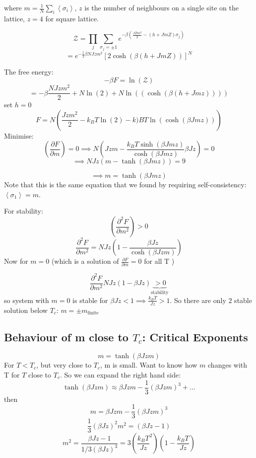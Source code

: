 \documentclass[11pt]{book}
\theoremstyle{definition}
\begin{document}
where $ m = \frac{1}{N}\sum_i \left \langle \sigma_i \right \rangle  $, $ z $ is the number of neighbours on a single site on the lattice, $ z=4 $ for square lattice.

\[ \mathcal{Z} = \prod_j \sum_{\sigma_j = \pm 1} e^{-\beta \left( \frac{JZm^2}{2}-\left( h+JmZ \right) \sigma_j \right) } \] 
\[ = e^{- \frac{1}{2} \beta NJzm^2} [2\cosh(\beta(h+JmZ))]^{N} \] 

The free energy:
\[ -\beta F = \ln(\mathcal{Z})  \] 
\[ = -\beta \frac{NJzm^2}{2}+N\ln(2) +N\ln((\cosh(\beta(h+Jmz))))  \] 
set $ h=0 $ 
\[ F = N\left( \frac{Jzm^2}{2} - k_BT \ln(2)-k)BT \ln(\cosh(\beta Jmz ))   \right)  \] 
Minimise:
\[ \left( \frac{\partial F}{\partial m} \right) = 0 \implies N \left( Jzm - \frac{k_BT\sinh(\beta Jmz)}{\cosh(\beta Jmz)} \beta Jz \right) = 0 \] 
\[ \implies NJz \left( m - \tanh(\beta Jmz) \right) = 9  \] 
\begin{shaded*}

\[ \implies m = \tanh(\beta Jmz) \] 
Note that this is the same equation that we found by requiring self-consistency: $ \left \langle \sigma_1 \right \rangle = m $.

\end{shaded*}
For stability:
\[ \left( \frac{\partial ^2F}{\partial m^2} \right) > 0 \] 
\[ \frac{\partial ^2F}{\partial m^2} = NJz \left( 1 - \frac{\beta Jz}{\cosh(\beta Jzm)} \right)   \] 
Now for $ m=0 $ (which is a solution of $ \frac{\partial F}{\partial m} =0 $ for all T )

\[ \frac{\partial ^2F}{\partial m^2} NJz(1-\beta Jz) \underbrace{> 0}_{\text{stability}}  \]  
so system with $ m=0 $ is stable for $ \beta Jz <1 \implies \frac{k_BT}{Jz} > 1 $. 
So there are only $ 2 $ stable solution below $ T_c $: $ m = \pm m_{\text{finite}} $ 

\subsection{Behaviour of m close to $ T_c $: Critical Exponents}

\[ m = \tanh(\beta Jzm) \] 
For $ T < T_c $, but very close to $ T_c $, m is small. 
Want to know how $ m $ changes with T for $ T $ close to $ T_c $.
So we can expand the right hand side:
\[ \tanh(\beta Jzm) \approx \beta Jzm - \frac{1}{3} (\beta Jzm)^3 + ...\] 
then
\[ m = \beta Jzm - \frac{1}{3} (\beta Jzm)^3\] 
\[ \frac{1}{3}(\beta Jz)^2 m^2 = (\beta Jz -1) \] 
\[ m^2 = \frac{\beta Jz -1}{1/3 (\beta Jz)^3} = 3\left( \frac{k_BT}{Jz}^2 \right) \left(1-\frac{k_BT}{Jz} \right) \] 
\end{document}
